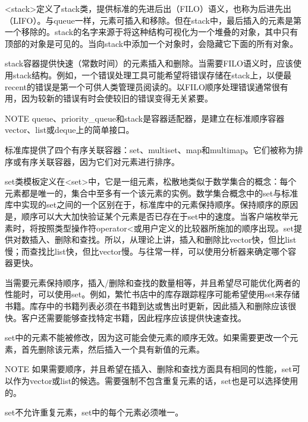 
<stack>定义了stack类，提供标准的先进后出（FILO）语义，也称为后进先出（LIFO）。与queue一样，元素可插入和移除。但在stack中，最后插入的元素是第一个移除的。stack的名字来源于将这种结构可视化为一个堆叠的对象，其中只有顶部的对象是可见的。当向stack中添加一个对象时，会隐藏它下面的所有对象。

stack容器提供快速（常数时间）的元素插入和删除。当需要FILO语义时，应该使用stack结构。例如，一个错误处理工具可能希望将错误存储在stack上，以便最 recent的错误是第一个可供人类管理员阅读的。以FILO顺序处理错误通常很有用，因为较新的错误有时会使较旧的错误变得无关紧要。

\begin{myNotic}{NOTE}
queue、priority\_queue和stack是容器适配器，是建立在标准顺序容器vector、list或deque上的简单接口。
\end{myNotic}


标准库提供了四个有序关联容器：set、multiset、map和multimap。它们被称为排序或有序关联容器，因为它们对元素进行排序。


set类模板定义在<set>中，它是一组元素，松散地类似于数学集合的概念：每个元素都是唯一的，集合中至多有一个该元素的实例。数学集合概念中的set与标准库中实现的set之间的一个区别在于，标准库中的元素保持顺序。保持顺序的原因是，顺序可以大大加快验证某个元素是否已存在于set中的速度。当客户端枚举元素时，将按照类型操作符operator<或用户定义的比较器所施加的顺序出现。set提供对数插入、删除和查找。所以，从理论上讲，插入和删除比vector快，但比list慢；而查找比list快，但比vector慢。与往常一样，可以使用分析器来确定哪个容器更快。

当需要元素保持顺序，插入/删除和查找的数量相等，并且希望尽可能优化两者的性能时，可以使用set。例如，繁忙书店中的库存跟踪程序可能希望使用set来存储书籍。库存中的书籍列表必须在书籍到达或售出时更新，因此插入和删除应该很快。客户还需要能够查找特定书籍，因此程序应该提供快速查找。

set中的元素不能被修改，因为这可能会使元素的顺序无效。如果需要更改一个元素，首先删除该元素，然后插入一个具有新值的元素。

\begin{myNotic}{NOTE}
如果需要顺序，并且希望在插入、删除和查找方面具有相同的性能，set可以作为vector或list的候选。需要强制不包含重复元素的话，set也是可以选择使用的。
\end{myNotic}

set不允许重复元素，set中的每个元素必须唯一。

